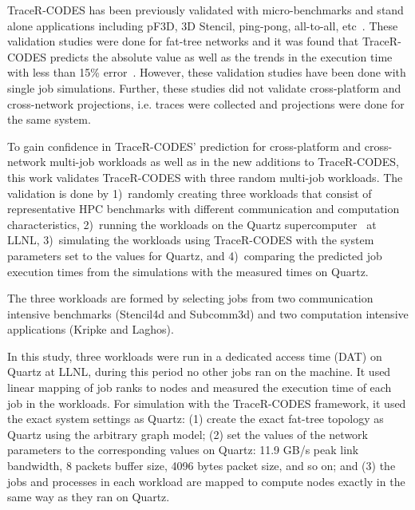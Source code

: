 
TraceR-CODES has been previously validated with micro-benchmarks and stand alone
applications including pF3D, 3D Stencil, ping-pong, all-to-all,
etc~\cite{Jain:sc2017}. These validation studies were done for fat-tree networks
and it was found that TraceR-CODES predicts the absolute value as well as the
trends in the execution time with less than 15\%
error~\cite{Jain:sc2017,acun:padabs2015}.  However, these validation studies 
have been done with single job simulations. Further, these studies did not
validate cross-platform and cross-network projections, i.e. traces were
collected and projections were done for the same system.

To gain confidence in TraceR-CODES' prediction for cross-platform and
cross-network multi-job workloads as well
as in the new additions to TraceR-CODES, this work validates TraceR-CODES with three random
multi-job workloads.
The validation is done by 1)~randomly creating three workloads that consist of 
representative HPC benchmarks with different communication and computation
characteristics, 2)~running the workloads on the Quartz supercomputer~\cite{quartz} at LLNL,
3)~simulating the workloads using TraceR-CODES with the system parameters
set to the values for Quartz, and 4)~comparing the predicted job execution
times from the simulations with the measured times on Quartz. 

The three workloads are formed by selecting jobs from two communication intensive
benchmarks (Stencil4d and Subcomm3d) and two computation intensive applications
(Kripke and Laghos). 

In this study, three workloads were run in a dedicated access time (DAT) on Quartz at LLNL, during this period
no other jobs ran on the machine. It used linear mapping of job
ranks to nodes and measured the execution time of each job in the workloads.
For simulation with the TraceR-CODES framework, it used the
exact system settings as Quartz: (1)  create
the exact fat-tree topology as Quartz using the arbitrary graph model; (2)
 set the values of the network parameters to the corresponding values on Quartz:
11.9 GB/s peak link bandwidth, 8 packets buffer size, 4096 bytes packet size,
and so on; and (3) the jobs and processes in each workload
are mapped to compute nodes exactly in the same
way as they ran on Quartz. 

